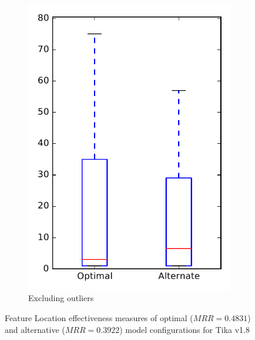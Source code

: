 \begin{figure}
\begin{subfigure}{.4\textwidth}
        \includegraphics[height=0.4\textheight]{figures/combo/flt_rq1_tika_no_outlier}
        \caption{Excluding outliers}\label{fig:combo:flt:rq1:tika_no_outlier}
    \end{subfigure}
\caption{Feature Location effectiveness measures of optimal ($MRR=0.4831$) and alternative ($MRR=0.3922$) model configurations for Tika v1.8}
\label{fig:combo:flt:rq1:tika}
\end{figure}
